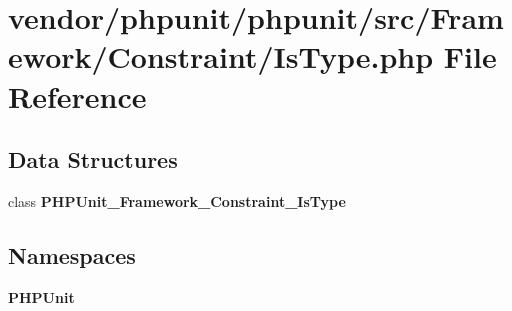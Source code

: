 \section{vendor/phpunit/phpunit/src/\+Framework/\+Constraint/\+Is\+Type.php File Reference}
\label{_is_type_8php}
\subsection*{Data Structures}
\begin{DoxyCompactItemize}
\item 
class {\bf P\+H\+P\+Unit\+\_\+\+Framework\+\_\+\+Constraint\+\_\+\+Is\+Type}
\end{DoxyCompactItemize}
\subsection*{Namespaces}
\begin{DoxyCompactItemize}
\item 
 {\bf P\+H\+P\+Unit}
\end{DoxyCompactItemize}
